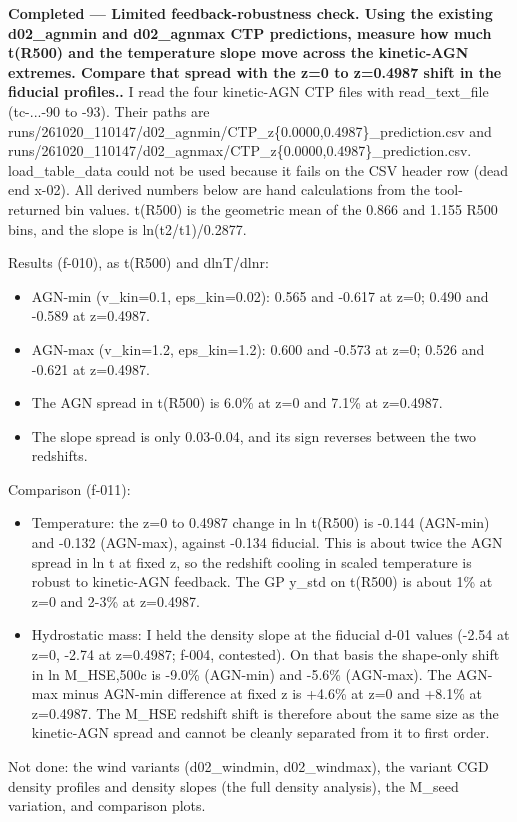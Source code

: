 \documentclass[11pt,a4paper]{article}
\begin{document}
\textbf{Completed --- Limited feedback-robustness check. Using the existing d02\_agnmin and d02\_agnmax CTP predictions, measure how much t(R500) and the temperature slope move across the kinetic-AGN extremes. Compare that spread with the z=0 to z=0.4987 shift in the fiducial profiles..} I read the four kinetic-AGN CTP files with read\_text\_file (tc-...-90 to -93). Their paths are runs/261020\_110147/d02\_agnmin/CTP\_z\{0.0000,0.4987\}\_prediction.csv and runs/261020\_110147/d02\_agnmax/CTP\_z\{0.0000,0.4987\}\_prediction.csv. load\_table\_data could not be used because it fails on the CSV header row (dead end x-02). All derived numbers below are hand calculations from the tool-returned bin values. t(R500) is the geometric mean of the 0.866 and 1.155 R500 bins, and the slope is ln(t2/t1)/0.2877.

Results (f-010), as t(R500) and dlnT/dlnr:

\begin{itemize}
  \item AGN-min (v\_kin=0.1, eps\_kin=0.02): 0.565 and -0.617 at z=0; 0.490 and -0.589 at z=0.4987.
  \item AGN-max (v\_kin=1.2, eps\_kin=1.2): 0.600 and -0.573 at z=0; 0.526 and -0.621 at z=0.4987.
  \item The AGN spread in t(R500) is 6.0\% at z=0 and 7.1\% at z=0.4987.
  \item The slope spread is only 0.03-0.04, and its sign reverses between the two redshifts.
\end{itemize}
Comparison (f-011):

\begin{itemize}
  \item Temperature: the z=0 to 0.4987 change in ln t(R500) is -0.144 (AGN-min) and -0.132 (AGN-max), against -0.134 fiducial. This is about twice the AGN spread in ln t at fixed z, so the redshift cooling in scaled temperature is robust to kinetic-AGN feedback. The GP y\_std on t(R500) is about 1\% at z=0 and 2-3\% at z=0.4987.
  \item Hydrostatic mass: I held the density slope at the fiducial d-01 values (-2.54 at z=0, -2.74 at z=0.4987; f-004, contested). On that basis the shape-only shift in ln M\_HSE,500c is -9.0\% (AGN-min) and -5.6\% (AGN-max). The AGN-max minus AGN-min difference at fixed z is +4.6\% at z=0 and +8.1\% at z=0.4987. The M\_HSE redshift shift is therefore about the same size as the kinetic-AGN spread and cannot be cleanly separated from it to first order.
\end{itemize}
Not done: the wind variants (d02\_windmin, d02\_windmax), the variant CGD density profiles and density slopes (the full density analysis), the M\_seed variation, and comparison plots.
\end{document}
